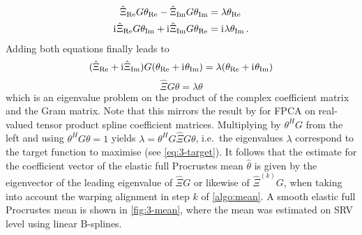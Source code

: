 \begin{align}
  \hat\Xi_{\mathrm{Re}} G \theta_{\mathrm{Re}} - \hat\Xi_{\mathrm{Im}} G \theta_{\mathrm{Im}} & = \lambda \theta_{\mathrm{Re}}\\
   \mathrm{i}\mkern1mu \hat\Xi_{\mathrm{Re}} G \theta_{\mathrm{Im}} + \mathrm{i}\mkern1mu \hat\Xi_{\mathrm{Im}} G \theta_{\mathrm{Re}} & = \mathrm{i}\mkern1mu \lambda \theta_{\mathrm{Im}} \,.
\end{align}
Adding both equations finally leads to  
\begin{equation}
  ( \hat\Xi_{\mathrm{Re}} + \mathrm{i}\mkern1mu \hat\Xi_{\mathrm{Im}}) G (\theta_{\mathrm{Re}} +  \mathrm{i}\mkern1mu \theta_{\mathrm{Im}}) = \lambda ( \theta_{\mathrm{Re}} + \mathrm{i}\mkern1mu \theta_{\mathrm{Im}})
\end{equation}
\begin{equation}
  \hat\Xi G \theta = \lambda \theta
\end{equation}
which is an eigenvalue problem on the product of the complex coefficient matrix and the Gram matrix.
Note that this mirrors the result by \cite{ReissXu2020} for FPCA on real-valued tensor product spline coefficient matrices.
Multiplying by $\theta^H G$ from the left and using $\theta^H G \theta = 1$ yields $\lambda = \theta^H G \hat\Xi G \theta$, i.e.\ the eigenvalues $\lambda$ correspond to the target function to maximise (see \cref{eq:3-target}).
It follows that the estimate for the coefficient vector of the elastic full Procrustes mean $\hat\theta$ is given by the eigenvector of the leading eigenvalue of $\hat\Xi G$ or likewise of $\hat\Xi^{(k)} G$, when taking into account the warping alignment in step $k$ of \cref{algo:mean}.
A smooth elastic full Procrustes mean is shown in \cref{fig:3-mean}, where the mean was estimated on SRV level using linear B-splines.
